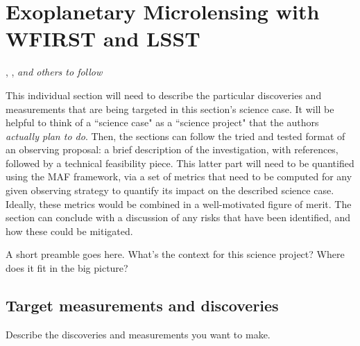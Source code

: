 %
%
%
%
%
%
%

\section{Exoplanetary Microlensing with WFIRST and LSST}
\def\secname{\chpname:microlensing}\label{sec:\secname}

,
,
{\it and others to follow}

This individual section will need to describe the particular
discoveries and measurements that are being targeted in this section's
science case. It will be helpful to think of a ``science case" as a
``science project" that the authors {\it actually plan to do}. Then,
the sections can follow the tried and tested format of an observing
proposal: a brief description of the investigation, with references,
followed by a technical feasibility piece. This latter part will need
to be quantified using the MAF framework, via a set of metrics that
need to be computed for any given observing strategy to quantify its
impact on the described science case. Ideally, these metrics would be
combined in a well-motivated figure of merit. The section can conclude
with a discussion of any risks that have been identified, and how
these could be mitigated.

A short preamble goes here. What's the context for this science
project? Where does it fit in the big picture?



\subsection{Target measurements and discoveries}
\label{sec:\secname:targets}

Describe the discoveries and measurements you want to make.

